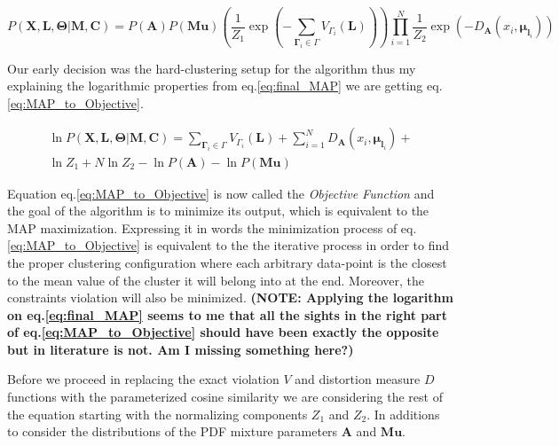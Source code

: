 \documentclass[dvips,dvipdfm,pdftex]{llncs}
\begin{document}
\begin{equation}
	P(\mathbf{X,L,\Theta}|\mathbf{M,C})=P(\mathbf{A})P(\mathbf{Mu})(\frac{1}{Z_{1}}\exp(-\sum_{\mathbf{\Gamma}_{i}\in\Gamma}V_{\Gamma_{i}}(\mathbf{L})))\prod_{i=1}^{N}\frac{1}{Z_{2}}\exp(-D_{\mathbf{A}}(x_{i},\mathbf{\mu}_{\mathbf{l}_{i}}))
\label{eq:final_MAP}
\end{equation}

Our early decision was the hard-clustering setup for the algorithm thus my explaining the logarithmic properties from eq.\ref{eq:final_MAP} we are getting eq.\ref{eq:MAP_to_Objective}.

\begin{equation}
	\begin{split}
		\ln P(\mathbf{X,L,\Theta}|\mathbf{M,C})=\sum_{\mathbf{\Gamma}_{i}\in\Gamma}V_{\Gamma_{i}}(\mathbf{L})+\sum_{i=1}^{N}D_{\mathbf{A}}(x_{i},\mathbf{\mu}_{\mathbf{l}_{i}})+ \\
		\ln Z_{1}+N\ln Z_{2}-\ln P(\mathbf{A})-\ln P(\mathbf{Mu})
	\end{split}
\label{eq:MAP_to_Objective}
\end{equation}

Equation eq.\ref{eq:MAP_to_Objective} is now called the \emph{Objective Function} and the goal of the algorithm is to minimize its output, which is equivalent to the MAP maximization. Expressing it in words the minimization process of eq.\ref{eq:MAP_to_Objective} is equivalent to the the iterative process in order to find the proper clustering configuration where each arbitrary data-point is the closest to the mean value of the cluster it will belong into at the end. Moreover, the constraints violation will also be minimized. \textbf{(NOTE: Applying the logarithm on eq.\ref{eq:final_MAP} seems to me that all the sights in the right part of eq.\ref{eq:MAP_to_Objective} should have been exactly the opposite but in literature is not. Am I missing something here?)}

Before we proceed in replacing the exact violation $V$ and distortion measure $D$ functions with the parameterized cosine similarity we are considering the rest of the equation starting with the normalizing components $Z_{1}$ and $Z_{2}$. In additions to consider the distributions of the PDF mixture parameters $\mathbf{A}$ and $\mathbf{Mu}$.
\end{document}
